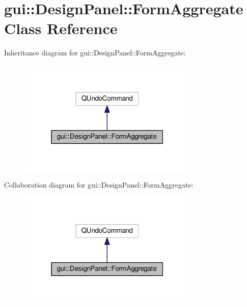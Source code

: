 \hypertarget{classgui_1_1DesignPanel_1_1FormAggregate}{}\section{gui\+:\+:Design\+Panel\+:\+:Form\+Aggregate Class Reference}
\label{classgui_1_1DesignPanel_1_1FormAggregate}


Inheritance diagram for gui\+:\+:Design\+Panel\+:\+:Form\+Aggregate\+:\nopagebreak
\begin{figure}[H]
\begin{center}
\leavevmode
\includegraphics[width=244pt]{classgui_1_1DesignPanel_1_1FormAggregate__inherit__graph}
\end{center}
\end{figure}


Collaboration diagram for gui\+:\+:Design\+Panel\+:\+:Form\+Aggregate\+:\nopagebreak
\begin{figure}[H]
\begin{center}
\leavevmode
\includegraphics[width=244pt]{classgui_1_1DesignPanel_1_1FormAggregate__coll__graph}
\end{center}
\end{figure}

